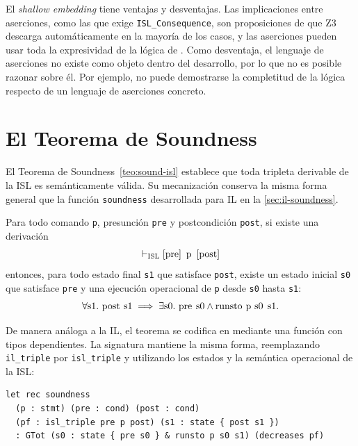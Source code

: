 \documentclass[a4paper,	11pt]{report}
\begin{document}
El \emph{shallow embedding} tiene ventajas y desventajas.
Las implicaciones entre aserciones,
como las que exige \lstinline|ISL_Consequence|,
son proposiciones de \fstar{} que Z3 descarga automáticamente en la mayoría de los casos,
y las aserciones pueden usar toda la expresividad de la lógica de \fstar{}.
Como desventaja,
el lenguaje de aserciones no existe como objeto dentro del desarrollo,
por lo que no es posible razonar sobre él.
Por ejemplo,
no puede demostrarse la completitud de la lógica respecto de un lenguaje de aserciones concreto.

\section{El Teorema de Soundness}
\label{sec:isl-soundness}
El Teorema de Soundness~\ref{teo:sound-isl} establece que toda tripleta derivable de la ISL es semánticamente válida.
Su mecanización conserva la misma forma general que la función \lstinline|soundness| desarrollada para IL en la \autoref{sec:il-soundness}.

\begin{teorema}
\label{teo:soundness-isl}
Para todo comando \lstinline|p|,
presunción \lstinline|pre| y postcondición \lstinline|post|,
si existe una derivación
$$\vdash_{\mathrm{ISL}} \itriple{\text{\lstinline|pre|}}{\text{\lstinline|p|}}{\text{\lstinline|post|}}$$
entonces, para todo estado final \lstinline|s1| que satisface \lstinline|post|,
existe un estado inicial \lstinline|s0| que satisface \lstinline|pre| y una ejecución operacional de \lstinline|p| desde \lstinline|s0| hasta \lstinline|s1|:
$$\forall \text{\lstinline|s1|}. \ \text{\lstinline|post s1|} \implies
\exists \text{\lstinline|s0|}. \ \text{\lstinline|pre s0|} \land \text{\lstinline|runsto p s0 s1|}.$$
\end{teorema}

De manera análoga a la IL,
el teorema se codifica en \fstar{} mediante una función con tipos dependientes.
La signatura mantiene la misma forma,
reemplazando \lstinline|il_triple| por \lstinline|isl_triple| y utilizando los estados y la semántica operacional de la ISL:

\begin{lstlisting}
let rec soundness
  (p : stmt) (pre : cond) (post : cond)
  (pf : isl_triple pre p post) (s1 : state { post s1 })
  : GTot (s0 : state { pre s0 } & runsto p s0 s1) (decreases pf)
\end{lstlisting}
\end{document}
